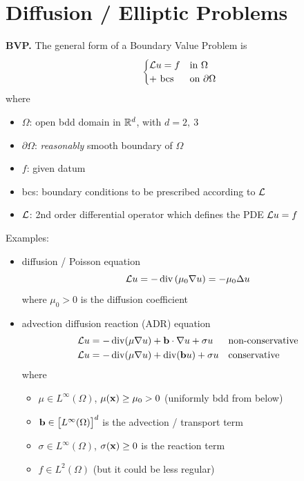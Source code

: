 

\section{Diffusion / Elliptic Problems}


\textbf{BVP.} The general form of a Boundary Value Problem is
\begin{equation}
\label{eqn:general}
\begin{cases}
\mathcal{L} u = f & \text{in }\Omega \\
+\text{ bcs} & \text{on }\partial\Omega 
\end{cases}
\end{equation}
where
\begin{itemize}
\item $\Omega$: open bdd domain in $\mathbb{R}^d$, with $d=2,\ 3$
\item $\partial\Omega$: \emph{reasonably} smooth boundary of $\Omega$
\item $f$: given datum
\item bcs: boundary conditions to be prescribed according to $\mathcal{L}$
\item $\mathcal{L}$: 2nd order differential operator which defines the PDE $\mathcal{L} u = f$ 
\end{itemize}

Examples:
\begin{itemize}
\item diffusion / Poisson equation
\begin{equation*}
\mathcal{L} u = -\operatorname{div}\left( \mu_0 \nabla u \right)=-\mu_0 \Delta u
\end{equation*}
where $\mu_0>0$ is the diffusion coefficient
\item advection diffusion reaction (ADR) equation
\begin{align*}
\mathcal{L} u &= -\operatorname{div}( \mu \nabla u )+\mathbf{b}\cdot\nabla u+\sigma u &&\text{non-conservative} \\
\mathcal{L} u &= -\operatorname{div}( \mu \nabla u )+\operatorname{div} (\mathbf{b} u)+\sigma u &&\text{conservative}
\end{align*}
where 
\begin{itemize}
\item $\mu\in L^\infty(\Omega)$, $\mu(\mathbf{x})\geq \mu_0>0$ (uniformly bdd from below)
\item $\mathbf{b} \in \big[ L^\infty(\Omega) \big]^d$ is the advection / transport term
\item $\sigma \in L^\infty(\Omega)$, $\sigma(\mathbf{x})\geq 0$ is the reaction term
\item $f\in L^2(\Omega)$ (but it could be less regular)
\end{itemize}
\end{itemize}

